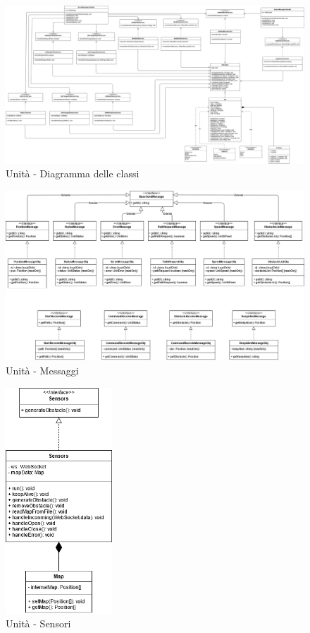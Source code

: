 \begin{landscape}
	\begin{figure}[h!]
		\includegraphics[width=24cm]{img/unit_architettura.png}
		\caption{Unità - Diagramma delle classi}
	\end{figure}
\end{landscape}

\begin{figure}[H]
	\centering
	\includegraphics[width=18cm]{img/unit_messaggi.png}
	\caption{Unità - Messaggi}
\end{figure}

\begin{figure}[H]
	\centering
	\includegraphics[width=4cm]{img/unit_sensori.png}
	\caption{Unità - Sensori}
\end{figure}